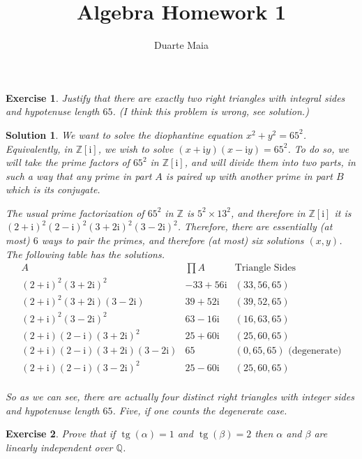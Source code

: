 \documentclass{article}
\title{Algebra Homework 1}
\author{Duarte Maia}
\newtheorem{ex}{Exercise}
\theoremstyle{nonumberplain}
\newtheorem{sol}{Solution}
\newcommand{\Z}{\mathbb{Z}}
\newcommand{\Q}{\mathbb{Q}}
\newcommand{\I}{\mathrm{i}}
\DeclareMathOperator{\tg}{tg}
\begin{document}
\maketitle

\begin{ex}
Justify that there are exactly two right triangles with integral sides and hypotenuse length $65$. (I think this problem is wrong, see solution.)
\end{ex}

\begin{sol}
We want to solve the diophantine equation $x^2 + y^2 = 65^2$. Equivalently, in $\Z[\I]$, we wish to solve $(x+\I y)(x - \I y) = 65^2$. To do so, we will take the prime factors of $65^2$ in $\Z[\I]$, and will divide them into two parts, in such a way that any prime in part $A$ is paired up with another prime in part $B$ which is its conjugate.

The usual prime factorization of $65^2$ in $\Z$ is $5^2 \times 13^2$, and therefore in $\Z[\I]$ it is $(2+\I)^2(2-\I)^2(3+2\I)^2(3-2\I)^2$. Therefore, there are essentially (at most) $6$ ways to pair the primes, and therefore (at most) six solutions $(x,y)$. The following table has the solutions.
\[
\begin{array}{l|l|l}
A & \prod A & \text{Triangle Sides}\\
\hline
(2+\I)^2(3+2\I)^2 & -33+56\I & (33,56,65) \\
(2+\I)^2(3+2\I)(3-2\I) & 39+52\I & (39,52,65)\\
(2+\I)^2(3-2\I)^2 & 63-16\I & (16,63,65) \\
(2+\I)(2-\I)(3+2\I)^2 & 25+60\I & (25,60,65)\\
(2+\I)(2-\I)(3+2\I)(3-2\I) & 65 & (0,65,65) \text{ (degenerate)}\\
(2+\I)(2-\I)(3-2\I)^2 & 25-60 \I & (25,60,65)\\
\end{array}
\]

So as we can see, there are actually four distinct right triangles with integer sides and hypotenuse length $65$. Five, if one counts the degenerate case.
\end{sol}

\begin{ex}
Prove that if $\tg(\alpha) = 1$ and $\tg(\beta) = 2$ then $\alpha$ and $\beta$ are linearly independent over $\Q$.
\end{ex}
\end{document}
